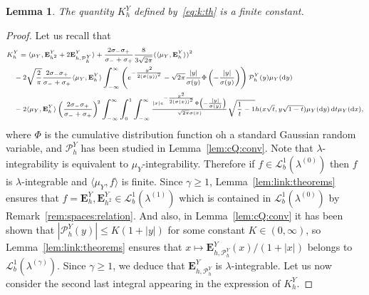 \documentclass[12pt]{article}
\numberwithin{equation}{section}
\newtheorem{lemma}{Lemma}
\theoremstyle{definition}
\theoremstyle{remark}
\newcommand{\vd}{\,\mathrm{d}}
\newcommand{\Lgb}[1]{\mathcal{L}^{1}_{b}(\lambda^{(#1)})}
\newcommand{\bfH}[1]{\mathbf{E}^Y_{#1}}
\begin{document}
\begin{lemma} \label{lem:finite:K}
	The quantity $K_h^Y$ defined by~\eqref{eq:k:th} is a finite constant. 
\end{lemma}
%
%
\begin{proof}
Let us recall that
\begin{equation}
{\scriptsize
\begin{split}
    & K_h^Y
	 = \langle \mu_Y , \bfH{h^2} + 2 \bfH{h,\mathcal{P}_{h}^Y} \rangle  
			+ \frac{ 2 \sigma_- \sigma_+}{\sigma_-+\sigma_+} \frac{8}{3 \sqrt{2\pi}} (\langle \mu_Y , \bfH{h} \rangle)^2 
			\\
	& \quad - 2 \sqrt{\frac{2}{\pi}} \frac{ 2 \sigma_- \sigma_+}{\sigma_-+\sigma_+} \langle \mu_Y , \bfH{h} \rangle
\int_{-\infty}^\infty \left( e^{-\frac{y^2}{2(\sigma(y))^2}} -\sqrt{2\pi} \frac{|y|}{\sigma(y)} \Phi\left(-\frac{|y|}{\sigma(y)}\right)\right) \mathcal{P}_{h}^Y(y) \mu_Y(\!\vd y)
	\\
	& \quad -
	2 \langle \mu_Y , \bfH{h} \rangle 
	\left(\frac{ 2 \sigma_- \sigma_+}{\sigma_-+\sigma_+}\right)^{\!2}
\int_{-\infty}^{\infty} \int_0^1 \int_{-\infty}^{\infty} \tfrac{|x| e^{-\frac{x^2}{2(\sigma(x))^2}} \Phi\left(-\frac{|y|}{\sigma(y)}\right)}{\sqrt{2\pi}\sigma(x)}  \sqrt{\frac{1}t-1} h(x \sqrt{t}, y \sqrt{1-t}) \mu_Y(\!\vd y) \vd t \mu_Y(\!\vd x),
\end{split}
}\end{equation}
where
$\Phi$ is the cumulative distribution function oh a standard Gaussian random variable,
and $\mathcal{P}_{h}^Y$ has been studied in Lemma~\ref{lem:cQ:conv}.
%
Note that $\lambda$-integrability is equivalent to $\mu_Y$-integrability.
Therefore if $f\in \Lgb{0}$ then $f$ is $\lambda$-integrable and $\langle \mu_Y , f \rangle$ is finite.
Since $\gamma\geq 1$, Lemma~\ref{lem:link:theorems} ensures that $f=\bfH{h},\bfH{h^2}\in \Lgb{1}$ which is contained in $\Lgb{0}$ by Remark~\ref{rem:spaces:relation}.
And also, in Lemma~\ref{lem:cQ:conv} it has been shown that $|\mathcal{P}_{h}^Y (y)| \leq K (1+|y|)$ for some constant $K\in (0,\infty)$,
so Lemma~\ref{lem:link:theorems} ensures that $x\mapsto \bfH{h, \mathcal{P}_{h}^Y}(x)/(1+|x|)$ belongs to $\Lgb{\gamma}$. Since $\gamma\geq 1$, we deduce that $\bfH{h, \mathcal{P}_{h}^Y}$ is $\lambda$-integrable.
%
Let us now consider the second last integral appearing in the expression of $K_h^Y$. 

\end{proof}
\end{document}
